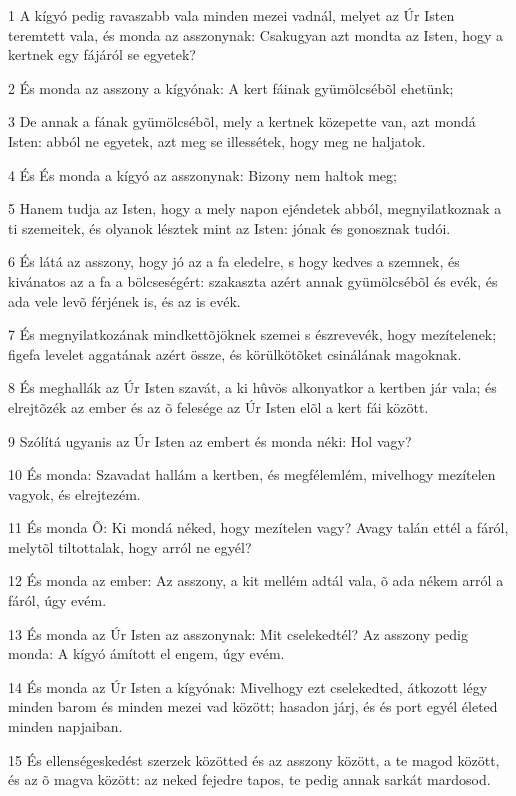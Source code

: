 \par 1 A kígyó pedig ravaszabb vala minden mezei vadnál, melyet az Úr Isten teremtett vala, és monda az asszonynak: Csakugyan azt mondta az Isten, hogy a kertnek egy fájáról se egyetek?
\par 2 És monda az asszony a kígyónak: A kert fáinak gyümölcsébõl ehetünk;
\par 3 De annak a fának gyümölcsébõl, mely a kertnek közepette van, azt mondá Isten: abból ne egyetek, azt meg se illessétek, hogy meg ne haljatok.
\par 4 És És monda a kígyó az asszonynak: Bizony nem haltok meg;
\par 5 Hanem tudja az Isten, hogy a mely napon ejéndetek abból, megnyilatkoznak a ti szemeitek, és olyanok lésztek mint az Isten: jónak és gonosznak tudói.
\par 6 És látá az asszony, hogy jó az a fa eledelre, s hogy kedves a szemnek, és kivánatos az a fa a bölcseségért: szakaszta azért annak gyümölcsébõl és evék, és ada vele levõ férjének is, és az is evék.
\par 7 És megnyilatkozának mindkettõjöknek szemei s észrevevék, hogy mezítelenek; figefa levelet aggatának azért össze, és körülkötõket csinálának magoknak.
\par 8 És meghallák az Úr Isten szavát, a ki hûvös alkonyatkor a kertben jár vala; és elrejtõzék az ember és az õ felesége az Úr Isten elõl a kert fái között.
\par 9 Szólítá ugyanis az Úr Isten az embert és monda néki: Hol vagy?
\par 10 És monda: Szavadat hallám a kertben, és megfélemlém, mivelhogy mezítelen vagyok, és elrejtezém.
\par 11 És monda Õ: Ki mondá néked, hogy mezítelen vagy? Avagy talán ettél a fáról, melytõl tiltottalak, hogy arról ne egyél?
\par 12 És monda az ember: Az asszony, a kit mellém adtál vala, õ ada nékem arról a fáról, úgy evém.
\par 13 És monda az Úr Isten az asszonynak: Mit cselekedtél? Az asszony pedig monda: A kígyó ámított el engem, úgy evém.
\par 14 És monda az Úr Isten a kígyónak: Mivelhogy ezt cselekedted, átkozott légy minden barom és minden mezei vad között; hasadon járj, és és port egyél életed minden napjaiban.
\par 15 És ellenségeskedést szerzek közötted és az asszony között, a te magod között, és az õ magva között: az neked fejedre tapos, te pedig annak sarkát mardosod.
